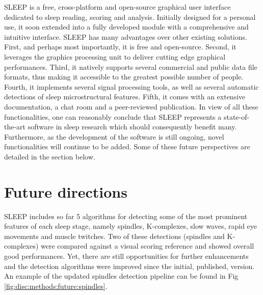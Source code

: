 SLEEP is a free, cross-platform and open-source graphical user interface dedicated to sleep reading, scoring and analysis. Initially designed for a personal use, it soon extended into a fully developed module with a comprehensive and intuitive interface. SLEEP has many advantages over other existing solutions. First, and perhaps most importantly, it is free and open-source. Second, it leverages the graphics processing unit to deliver cutting edge graphical performances. Third, it natively supports several commercial and public data file formats, thus making it accessible to the greatest possible number of people. Fourth, it implements several signal processing tools, as well as several automatic detections of sleep microstructural features. Fifth, it comes with an extensive documentation, a chat room and a peer-reviewed publication. In view of all these functionalities, one can reasonably conclude that SLEEP represents a state-of-the-art software in sleep research which should consequently benefit many. Furthermore, as the development of the software is still ongoing, novel functionalities will continue to be added. Some of these future perspectives are detailed in the section below.

\section{Future directions}
\label{disc:methods:future}

SLEEP includes so far 5 algorithms for detecting some of the most prominent features of each sleep stage, namely spindles, K-complexes, slow waves, rapid eye movements and muscle twitches. Two of these detections (spindles and K-complexes) were compared against a visual scoring reference and showed overall good performances. Yet, there are still opportunities for further enhancements and the detection algorithms were improved since the initial, published, version. An example of the updated spindles detection pipeline can be found in Fig \ref{fig:disc:methods:future:spindles}.

